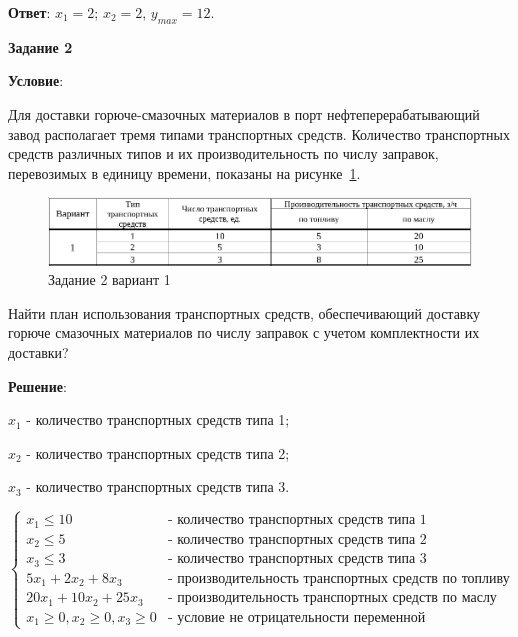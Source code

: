 \textbf{Ответ}: $x_1 = 2$; $x_2 = 2$, $y_{max} = 12$.

\newpage

\begin{center}
  \textbf{Задание 2}
\end{center}

\textbf{Условие}:

Для доставки горюче-смазочных материалов в порт нефтеперерабатывающий завод располагает тремя типами транспортных средств.
Количество транспортных средств различных типов и их производительность по числу заправок,
перевозимых в единицу времени, показаны на рисунке~\ref{fig:task2_1}.

\begin{figure}[!htb]
  \centering

  \includegraphics[width=16cm]
  {inc/task2_1.png}

  \caption{Задание 2 вариант 1}
  \label{fig:task2_1}
\end{figure}

Найти план использования транспортных средств,
обеспечивающий доставку горюче смазочных материалов по числу заправок
с учетом комплектности их доставки?

\textbf{Решение}:

$x_1$ - количество транспортных средств типа 1;

$x_2$ - количество транспортных средств типа 2;

$x_3$ - количество транспортных средств типа 3.

$$
\begin{cases}
  x_1  \leq 10 & \text{- количество транспортных средств типа 1}\\
  x_2 \leq 5   & \text{- количество транспортных средств типа 2}\\
  x_3 \leq 3   & \text{- количество транспортных средств типа 3}\\
  5 x_1 + 2 x_2 + 8 x_3 &\text{- производительность транспортных средств по топливу}\\
  20 x_1 + 10 x_2 + 25 x_3 &\text{- производительность транспортных средств по маслу}\\
  x_1 \geq 0, x_2 \geq 0, x_3 \geq 0 &\text{- условие не отрицательности переменной}
\end{cases}
$$

